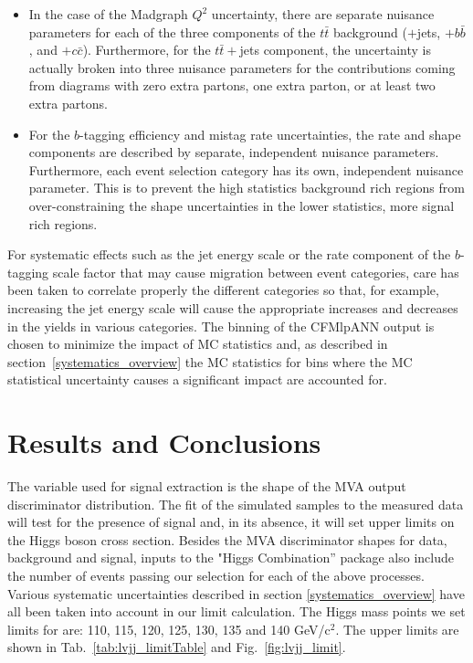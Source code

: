 \begin{itemize}

  \item  In the case of the Madgraph $Q^2$ uncertainty, there are
    separate nuisance parameters for each of the three components of the
    $t\bar{t}$ background ($+$jets, $+b\bar{b}$, and $+c\bar{c}$).
    Furthermore, for the $t\bar{t}+$jets component, the uncertainty is
    actually broken into three nuisance parameters for the
    contributions coming from diagrams with zero extra partons, one
    extra parton, or at least two extra partons. 

  \item For the $b$-tagging efficiency and mistag rate uncertainties,
    the rate and shape components are described by separate,
    independent nuisance parameters.  Furthermore, each event
    selection category has its own, independent nuisance parameter.
    This is to prevent the high statistics background rich regions
    from over-constraining the shape uncertainties in the lower
    statistics, more signal rich regions. 

\end{itemize}

\par For systematic effects such as the jet energy scale or the rate
component of the $b$-tagging scale factor that may cause migration
between event categories, care has been taken to correlate properly
the different categories so that, for example, increasing the jet
energy scale will cause the appropriate increases and decreases in the
yields in various categories.  The binning of the CFMlpANN output is
chosen to minimize the impact of MC statistics and, as described in 
section~\ref{systematics_overview} the MC statistics for bins where
the MC statistical uncertainty causes a significant impact are
accounted for. 


\section{Results and Conclusions}
\label{results_and_conclusions_overview}

\par The variable used for signal extraction is the shape of the MVA
output discriminator distribution.  The fit of the simulated samples
to the measured data will test for the presence of signal and, in its
absence, it will set upper limits on the Higgs boson cross
section. Besides the MVA discriminator shapes for data, background 
and signal, inputs to the "Higgs Combination'' package also include
the number of events passing our selection for each of the above
processes. Various systematic uncertainties described in
section \ref{systematics_overview} have all been taken into account in our
limit calculation. The Higgs mass points we set limits for are: 110,
115, 120, 125, 130, 135 and 140 GeV/c$^2$.  The upper limits are shown
in Tab.~\ref{tab:lvjj_limitTable} and Fig.~\ref{fig:lvjj_limit}.    

